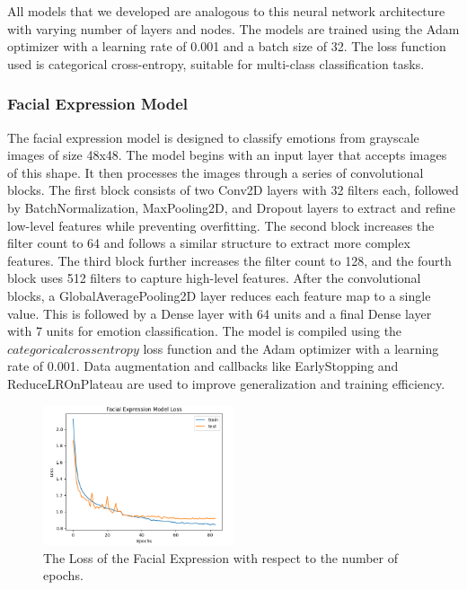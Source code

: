 \documentclass{article}
\begin{document}
All models that we developed are analogous to this neural network architecture with varying number of layers and nodes. The models are trained using the Adam optimizer with a learning rate of 0.001 and a batch size of 32. The loss function used is categorical cross-entropy, suitable for multi-class classification tasks.
\subsubsection{Facial Expression Model}
The facial expression model is designed to classify emotions from grayscale images of size 48x48. The model begins with an input layer that accepts images of this shape. It then processes the images through a series of convolutional blocks. The first block consists of two Conv2D layers with 32 filters each, followed by BatchNormalization, MaxPooling2D, and Dropout layers to extract and refine low-level features while preventing overfitting. The second block increases the filter count to 64 and follows a similar structure to extract more complex features. The third block further increases the filter count to 128, and the fourth block uses 512 filters to capture high-level features. After the convolutional blocks, a GlobalAveragePooling2D layer reduces each feature map to a single value. This is followed by a Dense layer with 64 units and a final Dense layer with 7 units for emotion classification. The model is compiled using the \(categorical crossentropy\) loss function and the Adam optimizer with a learning rate of 0.001. Data augmentation and callbacks like EarlyStopping and ReduceLROnPlateau are used to improve generalization and training efficiency.


\begin{figure}[h]
	\centering
	\includegraphics[width=0.5\textwidth]{figures/facial-expression-model} %
	\caption{The Loss of the Facial Expression with respect to the number of epochs.}
	\label{fig:facial-expression-model} %
\end{figure}
\end{document}

